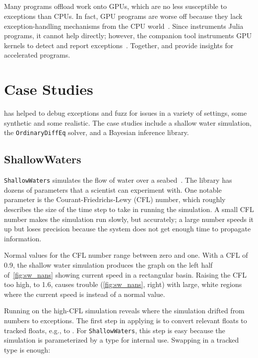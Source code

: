 \documentclass{juliacon}
\begin{document}
\subsection{\GPUFPX{}}
\label{s:gpufpx}

Many programs offload work onto GPUs, which are no less susceptible to \fp{} exceptions than CPUs.
In fact, GPU programs are worse off because they lack exception-handling mechanisms from the CPU world~\cite{llg-soap-2022}.
Since \FT{} instruments Julia programs, it cannot help directly;
however, the companion tool \GPUFPX{} instruments GPU kernels to detect and report
\fp{} exceptions~\cite{llsflg-hpdc-2023}.
Together, \FT{} and \GPUFPX{} provide insights for accelerated programs.


\section{Case Studies}
\label{s:casestudies}

\FlowFPX{} has helped to debug exceptions and fuzz for issues in a variety
of settings, some synthetic and some realistic.
The case studies include a shallow water simulation, the
\texttt{OrdinaryDiffEq} solver, and a Bayesian inference library.

\subsection{ShallowWaters}
\label{s:sw}

\texttt{ShallowWaters} simulates the flow of water over a
seabed~\cite{klowerNumberFormatsError2020,klowerPositsAlternativeFloats2019}.
The library has dozens of parameters that a scientist can experiment with.
One notable parameter is the Courant-Friedrichs-Lewy (CFL) number, which roughly describes the size of the time step to take in running the simulation.
A small CFL number makes the simulation run slowly, but accurately; a large number speeds it up but loses precision
because the system does not get enough time to propagate information.

Normal values for the CFL number range between zero and one.
With a CFL of 0.9, the shallow water simulation produces the graph on the left half
of~\cref{fig:sw_nans} showing current speed in a rectangular basin.
Raising the CFL too high, to 1.6, causes trouble
(\cref{fig:sw_nans}, right) with large, white regions where the
current speed is \NaN{} instead of a normal value.

Running \FT{} on the high-CFL simulation reveals where the simulation drifted
from numbers to \NaN{} exceptions.
The first step in applying \FT{} is to convert relevant floats to tracked
floats, e.g.,  to .
For \texttt{ShallowWaters}, this step is easy because the simulation is parameterized by
a \fp{} type for internal use.
Swapping in a tracked type is enough:
\end{document}
